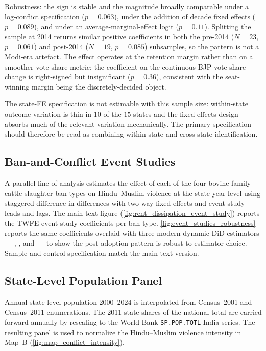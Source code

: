 Robustness: the sign is stable and the magnitude broadly comparable under a
log-conflict specification ($p=0.063$), under the addition of decade fixed
effects ($p=0.089$), and under an average-marginal-effect logit
($p=0.11$). Splitting the sample at 2014 returns similar positive
coefficients in both the pre-2014 ($N=23$, $p=0.061$) and post-2014
($N=19$, $p=0.085$) subsamples, so the pattern is not a Modi-era
artefact. The effect operates at the retention margin rather than on a
smoother vote-share metric: the coefficient on the continuous BJP
vote-share change is right-signed but insignificant ($p=0.36$), consistent
with the seat-winning margin being the discretely-decided object.

The state-FE specification is not estimable with this sample size:
within-state outcome variation is thin in $10$ of the $15$ states and the
fixed-effects design absorbs much of the relevant variation mechanically.
The primary specification should therefore be read as combining
within-state and cross-state identification.

\subsection{Ban-and-Conflict Event Studies} \label{app:event_studies}

A parallel line of analysis estimates the effect of each of the four
bovine-family cattle-slaughter-ban types on Hindu--Muslim violence at the
state-year level using staggered difference-in-differences with two-way
fixed effects and event-study leads and lags. The main-text figure
(\autoref{fig:rent_dissipation_event_study}) reports the TWFE event-study
coefficients per ban type. \autoref{fig:event_studies_robustness} reports
the same coefficients overlaid with three modern dynamic-DiD estimators
--- \citet*{cengizEffectMinimumWages2019}, \citet*{gardnerTwostageDifferencesDifferences2022}, and \citet*{liuPracticalGuideCounterfactual2024} ---
to show the post-adoption pattern is robust to estimator choice. Sample
and control specification match the main-text version.



\subsection{State-Level Population Panel} \label{app:population}

Annual state-level population 2000--2024 is interpolated from
Census~2001 and Census~2011 enumerations. The 2011 state shares of the
national total are carried forward annually by rescaling to the World Bank
\texttt{SP.POP.TOTL} India series. The resulting panel is used to
normalize the Hindu--Muslim violence intensity in Map~B
(\autoref{fig:map_conflict_intensity}).

